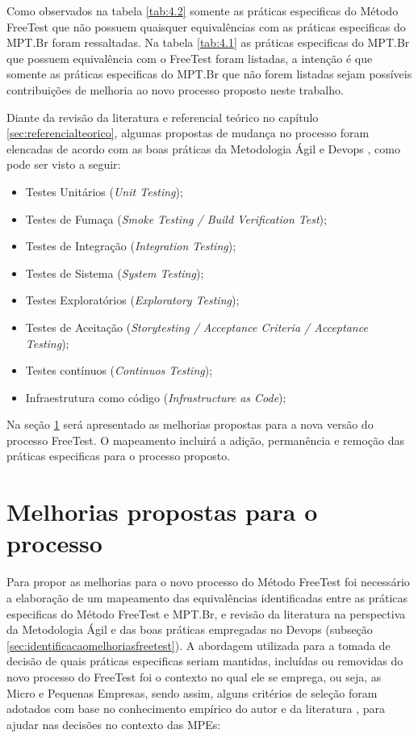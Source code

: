 Como observados na tabela \ref{tab:4.2} somente as práticas especificas do Método FreeTest que não possuem quaisquer equivalências com as práticas especificas do MPT.Br foram ressaltadas. Na tabela \ref{tab:4.1} as práticas especificas do MPT.Br que possuem equivalência com o FreeTest foram listadas, a intenção é que somente as práticas especificas do MPT.Br que não forem listadas sejam possíveis contribuições de melhoria ao novo processo proposto neste trabalho.

Diante da revisão da literatura e referencial teórico no capítulo \ref{sec:referencialteorico}, algumas propostas de mudança no processo foram elencadas de acordo com as boas práticas da Metodologia Ágil \cite{Beck2001,Debois2008} e Devops \cite{Howlett,Fitzgerald2014,Erich2014}, como pode ser visto a seguir:

\begin{itemize}
    \item Testes Unitários (\textit{Unit Testing});
    \item Testes de Fumaça (\textit{Smoke Testing / Build Verification Test});
    \item Testes de Integração (\textit{Integration Testing});
    \item Testes de Sistema (\textit{System Testing});
    \item Testes Exploratórios (\textit{Exploratory Testing});
    \item Testes de Aceitação (\textit{Storytesting / Acceptance Criteria / Acceptance Testing});
    \item Testes contínuos (\textit{Continuos Testing});
    \item Infraestrutura como código (\textit{Infrastructure as Code})\cite{BRAGA2015};
\end{itemize}

Na seção \ref{sec:melhoriaspropostas} será apresentado as melhorias propostas para a nova versão do processo FreeTest. O mapeamento incluirá a adição, permanência e remoção das práticas especificas para o processo proposto.

\section{Melhorias propostas para o processo}
\label{sec:melhoriaspropostas}

Para propor as melhorias para o novo processo do Método FreeTest foi necessário a elaboração de um mapeamento das equivalências identificadas entre as práticas especificas do Método FreeTest e MPT.Br, e revisão da literatura na perspectiva da Metodologia Ágil e das boas práticas empregadas no Devops (subseção \ref{sec:identificacaomelhoriasfreetest}).
A abordagem utilizada para a tomada de decisão de quais práticas especificas seriam mantidas, incluídas ou removidas do novo processo do FreeTest foi o contexto no qual ele se emprega, ou seja, as Micro e Pequenas Empresas, sendo assim, alguns critérios de seleção foram adotados com base no conhecimento empírico do autor e da literatura \cite{JamesWhittakerJasonCarollo2012, Especialistas2015, Whittaker2009, ABESSofftware2014, FelipeDreher2016, Laporte2010, Ramachandram2008, SilvaDias2015}, para ajudar nas decisões no contexto das MPEs:

